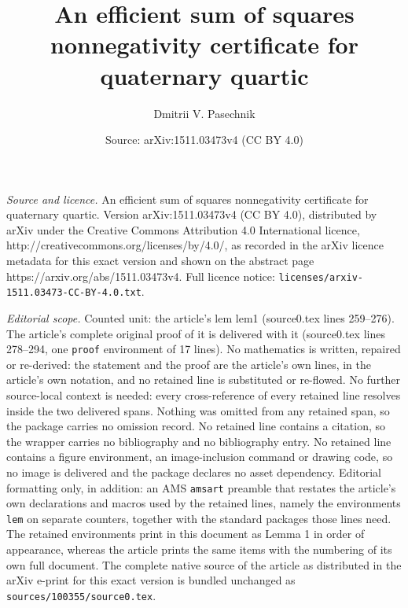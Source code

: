 \documentclass[10pt,a4paper]{amsart}
\title{An efficient sum of squares nonnegativity certificate for quaternary quartic}
\author{Dmitrii V. Pasechnik}
\date{Source: arXiv:1511.03473v4 (CC BY 4.0)}
\begin{document}
\maketitle

\noindent\emph{Source and licence.} An efficient sum of squares nonnegativity certificate for quaternary quartic. Version arXiv:1511.03473v4 (CC BY 4.0), distributed by arXiv under the Creative Commons Attribution 4.0 International licence, http://creativecommons.org/licenses/by/4.0/, as recorded in the arXiv licence metadata for this exact version and shown on the abstract page https://arxiv.org/abs/1511.03473v4. Full licence notice: \texttt{licenses/arxiv-1511.03473-CC-BY-4.0.txt}.\par\smallskip

\noindent\textit{Editorial scope.} Counted unit: the article's lem lem1 (source0.tex lines 259--276). The article's complete original proof of it is delivered with it (source0.tex lines 278--294, one \texttt{proof} environment of 17 lines). No mathematics is written, repaired or re-derived: the statement and the proof are the article's own lines, in the article's own notation, and no retained line is substituted or re-flowed.  No further source-local context is needed: every cross-reference of every retained line resolves inside the two delivered spans.  Nothing was omitted from any retained span, so the package carries no omission record.  No retained line contains a citation, so the wrapper carries no bibliography and no bibliography entry.  No retained line contains a figure environment, an image-inclusion command or drawing code, so no image is delivered and the package declares no asset dependency.  Editorial formatting only, in addition: an AMS \texttt{amsart} preamble that restates the article's own declarations and macros used by the retained lines, namely the environments \texttt{lem} on separate counters, together with the standard packages those lines need.  The retained environments print in this document as Lemma 1 in order of appearance, whereas the article prints the same items with the numbering of its own full document.  The complete native source of the article as distributed in the arXiv e-print for this exact version is bundled unchanged as \texttt{sources/100355/source0.tex}.
\end{document}
